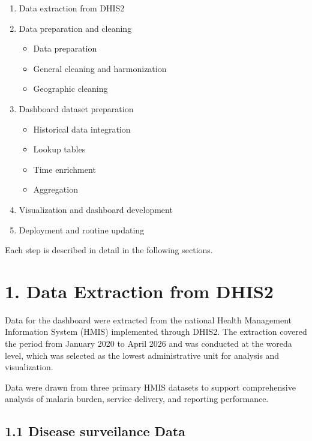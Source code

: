 \documentclass[
  letterpaper,
  DIV=11,
  numbers=noendperiod]{scrartcl}
\providecommand{\tightlist}{%
  \setlength{\itemsep}{0pt}\setlength{\parskip}{0pt}}
\begin{document}
\begin{enumerate}
\def\labelenumi{\arabic{enumi}.}
\tightlist
\item
  Data extraction from DHIS2
\item
  Data preparation and cleaning

  \begin{itemize}
  \tightlist
  \item
    Data preparation
  \item
    General cleaning and harmonization
  \item
    Geographic cleaning
  \end{itemize}
\item
  Dashboard dataset preparation

  \begin{itemize}
  \tightlist
  \item
    Historical data integration
  \item
    Lookup tables
  \item
    Time enrichment
  \item
    Aggregation
  \end{itemize}
\item
  Visualization and dashboard development
\item
  Deployment and routine updating
\end{enumerate}

Each step is described in detail in the following sections.

\section{1. Data Extraction from
DHIS2}\label{data-extraction-from-dhis2}

Data for the dashboard were extracted from the national Health
Management Information System (HMIS) implemented through DHIS2. The
extraction covered the period from January 2020 to April 2026 and was
conducted at the woreda level, which was selected as the lowest
administrative unit for analysis and visualization.

Data were drawn from three primary HMIS datasets to support
comprehensive analysis of malaria burden, service delivery, and
reporting performance.

\subsection{1.1 Disease surveilance
Data}\label{disease-surveilance-data}
\end{document}
